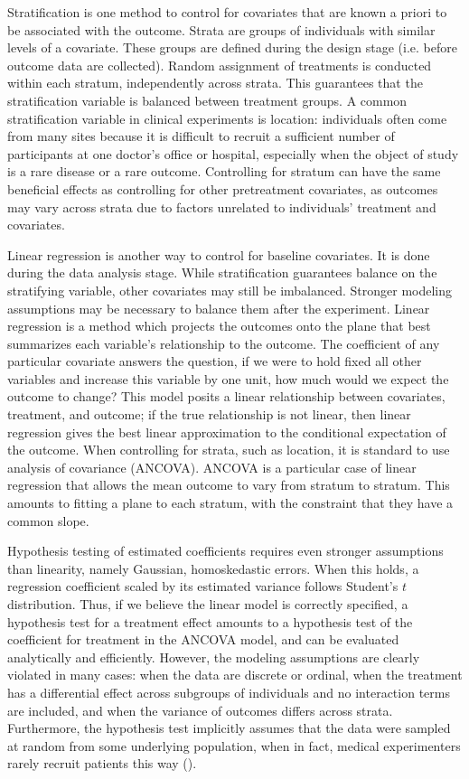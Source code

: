 \documentclass[12pt]{article}
\begin{document}
Stratification is one method to control for covariates that are known a priori to be associated with the outcome.
Strata are groups of individuals with similar levels of a covariate.
These groups are defined during the design stage (i.e. before outcome data are collected).
Random assignment of treatments is conducted within each stratum, independently across strata.
This guarantees that the stratification variable is balanced between treatment groups.
A common stratification variable in clinical experiments is location:
individuals often come from many sites because it is difficult to recruit a sufficient number of participants at one doctor's office or hospital,
especially when the object of study is a rare disease or a rare outcome.
Controlling for stratum can have the same beneficial effects as controlling for other pretreatment covariates, 
as outcomes may vary across strata due to factors unrelated to individuals' treatment and covariates.

Linear regression is another way to control for baseline covariates.
It is done during the data analysis stage.
While stratification guarantees balance on the stratifying variable, other covariates may still be imbalanced.
Stronger modeling assumptions may be necessary to balance them after the experiment.
Linear regression is a method which projects the outcomes onto the plane that best summarizes each variable's relationship to the outcome.
The coefficient of any particular covariate answers the question, if we were to hold fixed all other variables and increase this variable by one unit, how much would we expect the outcome to change?
This model posits a linear relationship between covariates, treatment, and outcome; 
if the true relationship is not linear, then linear regression gives the best linear approximation to the conditional expectation of the outcome.
When controlling for strata, such as location, it is standard to use analysis of covariance (ANCOVA).
ANCOVA is a particular case of linear regression that allows the mean outcome to vary from stratum to stratum.
This amounts to fitting a plane to each stratum, with the constraint that they have a common slope.

Hypothesis testing of estimated coefficients requires even stronger assumptions than linearity, namely Gaussian, homoskedastic errors.
When this holds, a regression coefficient scaled by its estimated variance follows Student's $t$ distribution.
Thus, if we believe the linear model is correctly specified, a hypothesis test for a treatment effect amounts to a hypothesis test of the coefficient for treatment in the ANCOVA model, and can be evaluated analytically and efficiently.
However, the modeling assumptions are clearly violated in many cases:
when the data are discrete or ordinal, 
when the treatment has a differential effect across subgroups of individuals and no interaction terms are included, 
and when the variance of outcomes differs across strata.
Furthermore, the hypothesis test implicitly assumes that the data were sampled at random from some underlying population, when in fact,
medical experimenters rarely recruit patients this way (\cite{ludbrook_why_1998}).
\end{document}
